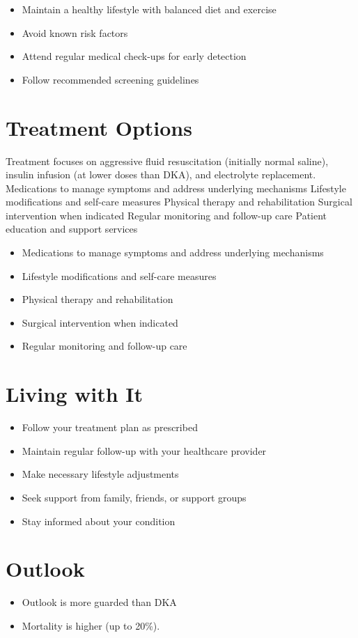 \begin{itemize}[noitemsep]
  \item Maintain a healthy lifestyle with balanced diet and exercise
  \item Avoid known risk factors
  \item Attend regular medical check-ups for early detection
  \item Follow recommended screening guidelines
\end{itemize}
\section{Treatment Options}
Treatment focuses on aggressive fluid resuscitation (initially normal saline), insulin infusion (at lower doses than DKA), and electrolyte replacement. Medications to manage symptoms and address underlying mechanisms Lifestyle modifications and self-care measures Physical therapy and rehabilitation Surgical intervention when indicated Regular monitoring and follow-up care Patient education and support services

\begin{itemize}[noitemsep]
  \item Medications to manage symptoms and address underlying mechanisms
  \item Lifestyle modifications and self-care measures
  \item Physical therapy and rehabilitation
  \item Surgical intervention when indicated
  \item Regular monitoring and follow-up care
\end{itemize}
\section{Living with It}
\begin{itemize}[noitemsep]
  \item Follow your treatment plan as prescribed
  \item Maintain regular follow-up with your healthcare provider
  \item Make necessary lifestyle adjustments
  \item Seek support from family, friends, or support groups
  \item Stay informed about your condition
\end{itemize}
\section{Outlook}
\begin{itemize}[noitemsep]
  \item Outlook is more guarded than DKA
  \item Mortality is higher (up to 20\%).
\end{itemize}
